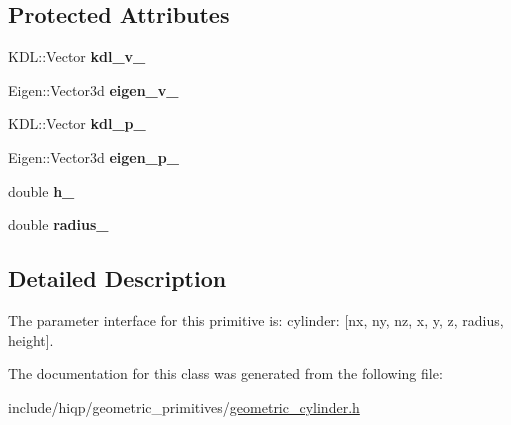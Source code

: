 \subsection*{Protected Attributes}
\begin{DoxyCompactItemize}
\item 
\hypertarget{classhiqp_1_1GeometricCylinder_ab0952221f812c2271a78d3a2f374566a}{K\-D\-L\-::\-Vector {\bfseries kdl\-\_\-v\-\_\-}}\label{classhiqp_1_1GeometricCylinder_ab0952221f812c2271a78d3a2f374566a}

\item 
\hypertarget{classhiqp_1_1GeometricCylinder_aa9b73a6812af8840270b8243e68dce61}{Eigen\-::\-Vector3d {\bfseries eigen\-\_\-v\-\_\-}}\label{classhiqp_1_1GeometricCylinder_aa9b73a6812af8840270b8243e68dce61}

\item 
\hypertarget{classhiqp_1_1GeometricCylinder_a6f9a73c17b10ea7703b7684d56b87b04}{K\-D\-L\-::\-Vector {\bfseries kdl\-\_\-p\-\_\-}}\label{classhiqp_1_1GeometricCylinder_a6f9a73c17b10ea7703b7684d56b87b04}

\item 
\hypertarget{classhiqp_1_1GeometricCylinder_a35ede95ad270fa050bbfe05f0ce21741}{Eigen\-::\-Vector3d {\bfseries eigen\-\_\-p\-\_\-}}\label{classhiqp_1_1GeometricCylinder_a35ede95ad270fa050bbfe05f0ce21741}

\item 
\hypertarget{classhiqp_1_1GeometricCylinder_a40869b7e337a8f476f73fd6f03a7caf6}{double {\bfseries h\-\_\-}}\label{classhiqp_1_1GeometricCylinder_a40869b7e337a8f476f73fd6f03a7caf6}

\item 
\hypertarget{classhiqp_1_1GeometricCylinder_ac3e9697f5dcf0a080a4c0c3ebd538ea3}{double {\bfseries radius\-\_\-}}\label{classhiqp_1_1GeometricCylinder_ac3e9697f5dcf0a080a4c0c3ebd538ea3}

\end{DoxyCompactItemize}


\subsection{Detailed Description}
The parameter interface for this primitive is\-: cylinder\-: \mbox{[}nx, ny, nz, x, y, z, radius, height\mbox{]}. 

The documentation for this class was generated from the following file\-:\begin{DoxyCompactItemize}
\item 
include/hiqp/geometric\-\_\-primitives/\hyperlink{geometric__cylinder_8h}{geometric\-\_\-cylinder.\-h}\end{DoxyCompactItemize}
